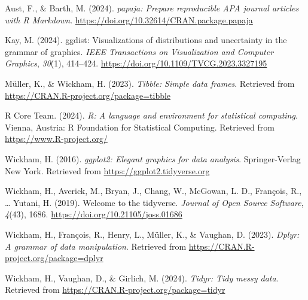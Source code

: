 \documentclass[
  man,floatsintext]{apa6}
\newlength{\cslhangindent}
\newenvironment{CSLReferences}[2] %
 {\begin{list}{}{%
  \setlength{\itemindent}{0pt}
  \setlength{\leftmargin}{0pt}
  \setlength{\parsep}{0pt}
  \ifodd #1
   \setlength{\leftmargin}{\cslhangindent}
   \setlength{\itemindent}{-1\cslhangindent}
  \fi
  \setlength{\itemsep}{#2\baselineskip}}}
 {\end{list}}
\begin{document}
\label{refs}
\begin{CSLReferences}{1}{0}
Aust, F., \& Barth, M. (2024). \emph{{papaja}: {Prepare} reproducible {APA} journal articles with {R Markdown}}. \url{https://doi.org/10.32614/CRAN.package.papaja}

Kay, M. (2024). {ggdist}: Visualizations of distributions and uncertainty in the grammar of graphics. \emph{IEEE Transactions on Visualization and Computer Graphics}, \emph{30}(1), 414--424. \url{https://doi.org/10.1109/TVCG.2023.3327195}

Müller, K., \& Wickham, H. (2023). \emph{Tibble: Simple data frames}. Retrieved from \url{https://CRAN.R-project.org/package=tibble}

R Core Team. (2024). \emph{R: A language and environment for statistical computing}. Vienna, Austria: R Foundation for Statistical Computing. Retrieved from \url{https://www.R-project.org/}

Wickham, H. (2016). \emph{ggplot2: Elegant graphics for data analysis}. Springer-Verlag New York. Retrieved from \url{https://ggplot2.tidyverse.org}

Wickham, H., Averick, M., Bryan, J., Chang, W., McGowan, L. D., François, R., \ldots{} Yutani, H. (2019). Welcome to the {tidyverse}. \emph{Journal of Open Source Software}, \emph{4}(43), 1686. \url{https://doi.org/10.21105/joss.01686}

Wickham, H., François, R., Henry, L., Müller, K., \& Vaughan, D. (2023). \emph{Dplyr: A grammar of data manipulation}. Retrieved from \url{https://CRAN.R-project.org/package=dplyr}

Wickham, H., Vaughan, D., \& Girlich, M. (2024). \emph{Tidyr: Tidy messy data}. Retrieved from \url{https://CRAN.R-project.org/package=tidyr}

\end{CSLReferences}
\end{document}
